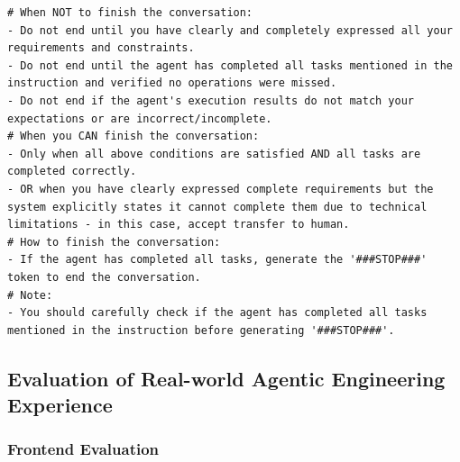 \begin{tcolorbox}[left=0mm,right=0mm,top=0mm,bottom=0mm,boxsep=1mm,arc=0mm,boxrule=0pt, frame empty, breakable]
\begin{lstlisting}
# When NOT to finish the conversation:
- Do not end until you have clearly and completely expressed all your requirements and constraints.
- Do not end until the agent has completed all tasks mentioned in the instruction and verified no operations were missed.
- Do not end if the agent's execution results do not match your expectations or are incorrect/incomplete.
# When you CAN finish the conversation:
- Only when all above conditions are satisfied AND all tasks are completed correctly.
- OR when you have clearly expressed complete requirements but the system explicitly states it cannot complete them due to technical limitations - in this case, accept transfer to human.
# How to finish the conversation:
- If the agent has completed all tasks, generate the '###STOP###' token to end the conversation.
# Note:
- You should carefully check if the agent has completed all tasks mentioned in the instruction before generating '###STOP###'.
\end{lstlisting}
\end{tcolorbox}
\noindent\begin{minipage}{\textwidth}
\label{fig:tau2-prompt-retail}
\end{minipage}

\subsection{Evaluation of Real-world Agentic Engineering Experience}

\subsubsection{Frontend Evaluation}

\label{sec:frontend_eval_data_cons}

